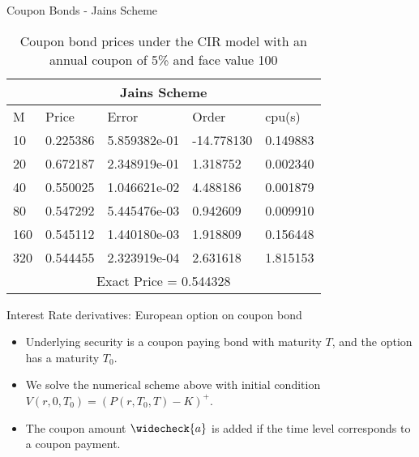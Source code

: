 \documentclass{beamer}
\begin{document}
 \begin{frame}{Coupon Bonds - Jains Scheme}
    \begin{table}[htp]
    \begin{tabular}{ |p{1cm}|p{1.7cm}|p{2.5cm}|p{2cm}|p{1.5cm}|  }
    
     \hline
     \multicolumn{5}{|c|}{Jains Scheme} \\
     \hline
     M & Price & Error & Order & cpu(s)\\
     \hline
    10 & 0.225386 & 5.859382e-01 & -14.778130 & 0.149883\\
    20 & 0.672187 & 2.348919e-01 & 1.318752 & 0.002340\\
    40 & 0.550025 & 1.046621e-02 & 4.488186 & 0.001879\\
    80 & 0.547292 & 5.445476e-03 & 0.942609 & 0.009910\\
    160 & 0.545112 & 1.440180e-03 & 1.918809 & 0.156448\\
    320 & 0.544455 & 2.323919e-04 & 2.631618 & 1.815153\\
     \hline
     \multicolumn{5}{|c|}{Exact Price = 0.544328} \\
     \hline
     
    \end{tabular}
    \caption{ Coupon bond prices under the CIR model with an annual coupon of 5\% and face value 100}
        \end{table}
\end{frame}
 
 

 
\begin{frame}{Interest Rate derivatives: European option on coupon bond}
 
\begin{itemize}
    \item Underlying security is a coupon paying bond with maturity $T$, and the option has a maturity $T_{0}$.
    \item We solve the numerical scheme above with initial condition $V(r,0,T_{0}) = (P(r,T_{0},T) - K)^{+}$.
    \item The coupon amount $\widecheck{a}$ is added if the time level corresponds to a coupon payment.
\end{itemize}
 
\end{frame}
\end{document}
